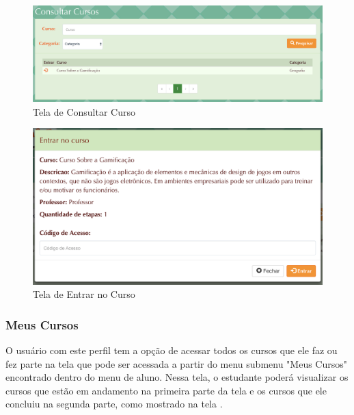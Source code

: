 \begin{figure}[H]
  \centering
  \includegraphics[scale=0.37]{images/proposta-img/Figura4-36.png}
  \caption{Tela de Consultar Curso}
  \label{fig:Figura4-36}
\end{figure}

\begin{figure}[H]
  \centering
  \includegraphics[scale=0.5]{images/proposta-img/Figura4-37.png}
  \caption{Tela de Entrar no Curso}
  \label{fig:Figura4-37}
\end{figure}

\subsubsection{Meus Cursos}

O usuário com este perfil tem a opção de acessar todos os cursos que ele faz ou fez parte na tela que pode ser acessada a partir do menu submenu "Meus Cursos" encontrado dentro do menu de aluno. Nessa tela, o estudante poderá  visualizar os cursos que estão em andamento na primeira parte da tela e os cursos que ele concluiu na segunda parte, como mostrado na tela .

